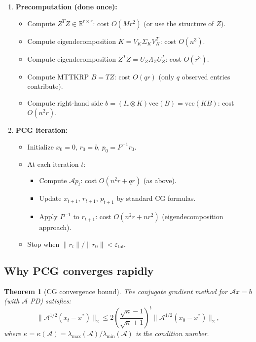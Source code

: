 \documentclass[12pt]{article}
\newtheorem{theorem}{Theorem}
\begin{document}
\begin{enumerate}
\item \textbf{Precomputation (done once):}
   \begin{itemize}
   \item Compute $Z^T Z \in \mathbb{R}^{r\times r}$: cost $O(Mr^2)$ (or use the structure of $Z$).
   \item Compute eigendecomposition $K = V_K \Sigma_K V_K^T$: cost $O(n^3)$.
   \item Compute eigendecomposition $Z^T Z = U_{Z} \Lambda_Z U_Z^T$: cost $O(r^3)$.
   \item Compute MTTKRP $B = TZ$: cost $O(qr)$ (only $q$ observed entries contribute).
   \item Compute right-hand side $b = (I_r \otimes K)\mathrm{vec}(B) = \mathrm{vec}(KB)$: cost $O(n^2 r)$.
   \end{itemize}

\item \textbf{PCG iteration:}
   \begin{itemize}
   \item Initialize $x_0 = 0$, $r_0 = b$, $p_0 = P^{-1}r_0$.
   \item At each iteration $t$:
      \begin{itemize}
      \item Compute $\mathcal{A} p_t$: cost $O(n^2 r + qr)$ (as above).
      \item Update $x_{t+1}$, $r_{t+1}$, $p_{t+1}$ by standard CG formulas.
      \item Apply $P^{-1}$ to $r_{t+1}$: cost $O(n^2 r + nr^2)$ (eigendecomposition approach).
      \end{itemize}
   \item Stop when $\|r_t\| / \|r_0\| < \varepsilon_{\mathrm{tol}}$.
   \end{itemize}
\end{enumerate}

\subsection{Why PCG converges rapidly}

\begin{theorem}[CG convergence bound]\label{thm:cg-conv}
The conjugate gradient method for $\mathcal{A}x = b$ (with $\mathcal{A}$ PD) satisfies:
\[
\|\mathcal{A}^{1/2}(x_t - x^*)\|_2 \leq 2\left(\frac{\sqrt{\kappa} - 1}{\sqrt{\kappa} + 1}\right)^t \|\mathcal{A}^{1/2}(x_0 - x^*)\|_2,
\]
where $\kappa = \kappa(\mathcal{A}) = \lambda_{\max}(\mathcal{A})/\lambda_{\min}(\mathcal{A})$ is the condition number.
\end{theorem}
\end{document}
